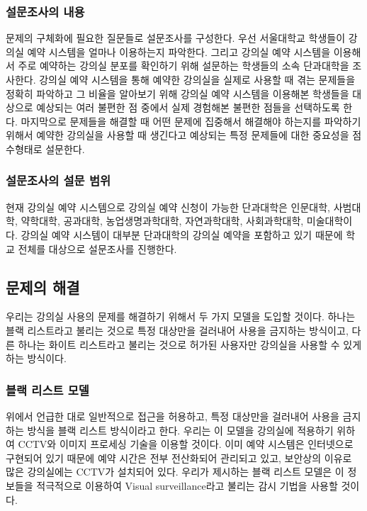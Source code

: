 \documentclass[11pt,a4paper]{article}
\begin{document}
\subsubsection{설문조사의 내용}
문제의 구체화에 필요한 질문들로 설문조사를 구성한다. 우선 서울대학교 학생들이 강의실 예약 시스템을 얼마나 이용하는지 파악한다. 그리고 강의실 예약 시스템을 이용해서 주로 예약하는 강의실 분포를 확인하기 위해 설문하는 학생들의 소속 단과대학을 조사한다.
강의실 예약 시스템을 통해 예약한 강의실을 실제로 사용할 때 겪는 문제들을 정확히 파악하고 그 비율을 알아보기 위해 강의실 예약 시스템을 이용해본 학생들을 대상으로 예상되는 여러 불편한 점 중에서 실제 경험해본 불편한 점들을 선택하도록 한다.
마지막으로 문제들을 해결할 때 어떤 문제에 집중해서 해결해야 하는지를 파악하기 위해서 예약한 강의실을 사용할 때 생긴다고 예상되는 특정 문제들에 대한 중요성을 점수형태로 설문한다.

\subsubsection{설문조사의 설문 범위}
현재 강의실 예약 시스템으로 강의실 예약 신청이 가능한 단과대학은 인문대학, 사범대학, 약학대학, 공과대학, 농업생명과학대학, 자연과학대학, 사회과학대학, 미술대학이다.
강의실 예약 시스템이 대부분 단과대학의 강의실 예약을 포함하고 있기 때문에 학교 전체를 대상으로 설문조사를 진행한다.

\subsection{문제의 해결}
우리는 강의실 사용의 문제를 해결하기 위해서 두 가지 모델을 도입할 것이다.
하나는 블랙 리스트라고 불리는 것으로 특정 대상만을 걸러내어 사용을 금지하는
방식이고, 다른 하나는 화이트 리스트라고 불리는 것으로 허가된 사용자만 강의실을
사용할 수 있게 하는 방식이다.

\subsubsection{블랙 리스트 모델}
위에서 언급한 대로 일반적으로 접근을 허용하고, 특정 대상만을 걸러내어 사용을
금지하는 방식을 블랙 리스트 방식이라고 한다. 우리는 이 모델을 강의실에 적용하기
위하여 CCTV와 이미지 프로세싱 기술을 이용할 것이다. 이미 예약 시스템은
인터넷으로 구현되어 있기 때문에 예약 시간은 전부 전산화되어 관리되고 있고,
보안상의 이유로 많은 강의실에는 CCTV가 설치되어 있다. 우리가 제시하는 블랙
리스트 모델은 이 정보들을 적극적으로 이용하여 Visual surveillance라고 불리는
감시 기법을 사용할 것이다.
\end{document}
